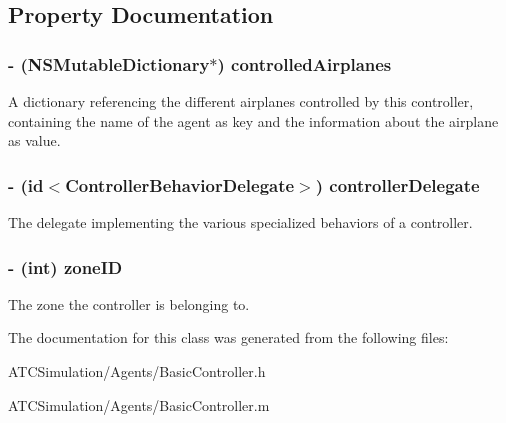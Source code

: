 \subsection{\-Property \-Documentation}
\hypertarget{interface_basic_controller_aa5144e6cc47e8988e9d14272a9c41e0d}{
\subsubsection[{controlled\-Airplanes}]{\setlength{\rightskip}{0pt plus 5cm}-\/ (\-N\-S\-Mutable\-Dictionary$\ast$) controlled\-Airplanes}}
\label{interface_basic_controller_aa5144e6cc47e8988e9d14272a9c41e0d}
\-A dictionary referencing the different airplanes controlled by this controller, containing the name of the agent as key and the information about the airplane as value. \hypertarget{interface_basic_controller_ac46747a2a5c535b5fd787a72d035cfc8}{
\subsubsection[{controller\-Delegate}]{\setlength{\rightskip}{0pt plus 5cm}-\/ (id$<${\bf \-Controller\-Behavior\-Delegate}$>$) controller\-Delegate}}
\label{interface_basic_controller_ac46747a2a5c535b5fd787a72d035cfc8}
\-The delegate implementing the various specialized behaviors of a controller. \hypertarget{interface_basic_controller_a4a00fc7e962440447df674c6dea7077c}{
\subsubsection[{zone\-I\-D}]{\setlength{\rightskip}{0pt plus 5cm}-\/ (int) zone\-I\-D}}
\label{interface_basic_controller_a4a00fc7e962440447df674c6dea7077c}
\-The zone the controller is belonging to. 

\-The documentation for this class was generated from the following files\-:\begin{DoxyCompactItemize}
\item 
\-A\-T\-C\-Simulation/\-Agents/\-Basic\-Controller.\-h\item 
\-A\-T\-C\-Simulation/\-Agents/\-Basic\-Controller.\-m\end{DoxyCompactItemize}
